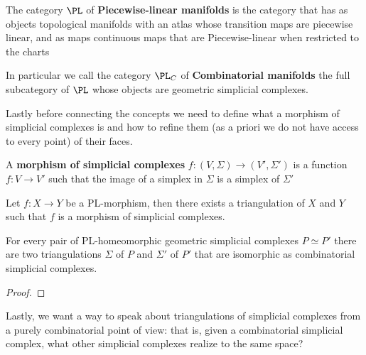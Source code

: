 \begin{definition}[$\PL$]\hfill 

        The category $\PL$ of \textbf{Piecewise-linear manifolds} is the category that has as objects topological manifolds with an atlas
        whose transition maps are piecewise linear,
        and as maps continuous maps that are Piecewise-linear when restricted to the charts

        In particular we call the category $\PL_C$ of \textbf{Combinatorial manifolds} the full subcategory of $\PL$ whose objects are geometric simplicial complexes.
\end{definition}

Lastly before connecting the concepts we need to define what a morphism of simplicial complexes is and how to refine them 
(as a priori we do not have access to every point) of their faces.
\begin{definition}
    A \textbf{morphism of simplicial complexes} $f:(V,\Sigma)\to(V',\Sigma')$ is a function $f:V\to V'$ such that the image of a simplex in $\Sigma$ is a simplex of $\Sigma'$
\end{definition}
\begin{theorem}\hfill 

    Let $f:X\to Y$ be a PL-morphism, then there exists a triangulation of $X$ and $Y$ such that $f$ is a morphism of simplicial complexes.    
\end{theorem}
\begin{corollary}\hfill 

    For every pair of PL-homeomorphic geometric simplicial complexes $P\simeq P'$ there are two triangulations $\Sigma$ of $P$ and $\Sigma'$ of $P'$ that are isomorphic 
    as combinatorial simplicial complexes.
\end{corollary}
\begin{proof}
\end{proof}

Lastly, we want a way to speak about triangulations of simplicial complexes from a purely combinatorial point of view: that is, given a combinatorial simplicial complex, 
what other simplicial complexes realize to the same space?

